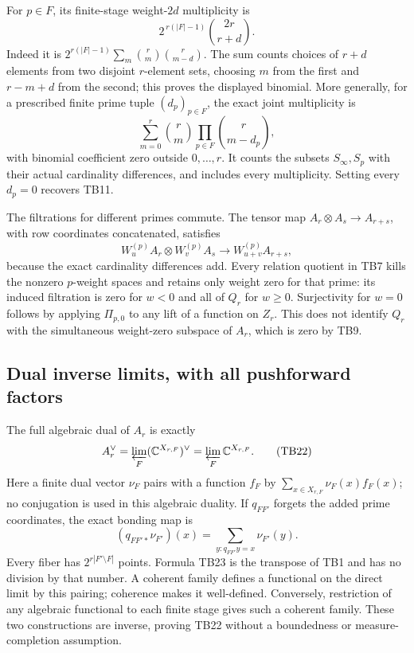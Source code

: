 For \(p\in F\), its finite-stage weight-\(2d\) multiplicity is
\[
2^{\,r(|F|-1)}\binom{2r}{r+d}.
\tag{TB20}
\]
Indeed it is
\(2^{r(|F|-1)}\sum_m\binom rm\binom r{m-d}\).
The sum counts choices of \(r+d\) elements from two disjoint
\(r\)-element sets, choosing \(m\) from the first and
\(r-m+d\) from the second; this proves the displayed binomial.
More generally, for a prescribed finite prime tuple
\((d_p)_{p\in F}\), the exact joint multiplicity is
\[
\sum_{m=0}^r\binom rm\prod_{p\in F}\binom r{m-d_p},
\tag{TB21}
\]
with binomial coefficient zero outside \(0,\ldots,r\).
It counts the subsets \(S_\infty,S_p\) with their actual
cardinality differences, and includes every multiplicity.
Setting every \(d_p=0\) recovers TB11.

The filtrations for different primes commute. The tensor map
\(A_r\otimes A_s\to A_{r+s}\), with row coordinates concatenated,
satisfies
\[
W^{(p)}_u A_r\otimes W^{(p)}_v A_s
       \longrightarrow W^{(p)}_{u+v}A_{r+s},
\]
because the exact cardinality differences add.
Every relation quotient in TB7 kills the nonzero \(p\)-weight
spaces and retains only weight zero for that prime:
its induced filtration is zero for \(w<0\) and all of \(Q_r\)
for \(w\ge0\). Surjectivity for \(w=0\) follows by applying
\(\Pi_{p,0}\) to any lift of a function on \(Z_r\).
This does not identify \(Q_r\) with the simultaneous weight-zero
subspace of \(A_r\), which is zero by TB9.

\subsection{Dual inverse limits, with all pushforward factors}

The full algebraic dual of \(A_r\) is exactly
\[
A_r^\vee
=\varprojlim_F(\mathbb C^{X_{r,F}})^\vee
=\varprojlim_F\mathbb C^{X_{r,F}}.
\tag{TB22}
\]
Here a finite dual vector \(\nu_F\) pairs with a function \(f_F\)
by \(\sum_{x\in X_{r,F}}\nu_F(x)f_F(x)\); no conjugation is used
in this algebraic duality. If \(q_{FF'}\) forgets the added prime
coordinates, the exact bonding map is
\[
(q_{FF'*}\nu_{F'})(x)
   =\sum_{y:q_{FF'}y=x}\nu_{F'}(y).
\tag{TB23}
\]
Every fiber has \(2^{r|F'\setminus F|}\) points. Formula TB23 is
the transpose of TB1 and has no division by that number.
A coherent family defines a functional on the direct limit
by this pairing; coherence makes it well-defined. Conversely,
restriction of any algebraic functional to each finite stage
gives such a coherent family. These two constructions are inverse,
proving TB22 without a boundedness or measure-completion assumption.

